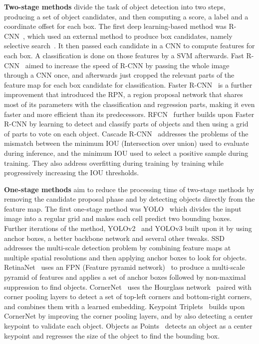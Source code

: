 \documentclass[10pt, conference, compsocconf]{IEEEtran}
\begin{document}
\textbf{Two-stage methods} divide the task of object detection into two steps, producing a set of object candidates, and then computing a score, a label and a coordinate offset for each box. The first deep learning-based method was R-CNN~\cite{rcnn_Girshick_2014_CVPR}, which used an external method to produce box candidates, namely selective search~\cite{uijlings2013selective}. It then passed each candidate in a CNN to compute features for each box. A classification is done on those features by a SVM afterwards. Fast R-CNN~\cite{Girshick_2015_ICCV_fast} aimed to increase the speed of R-CNN by passing the whole image through a CNN once, and afterwards just cropped the relevant parts of the feature map for each box candidate for classification. Faster R-CNN~\cite{ren2015faster} is a further improvement that introduced the RPN, a region proposal network that shares most of its parameters with the classification and regression parts, making it even faster and more efficient than its predecessors. RFCN~\cite{RFCN_NIPS2016_6465} further builds upon Faster R-CNN by learning to detect and classify parts of objects and then using a grid of parts to vote on each object. Cascade R-CNN~\cite{cai2018cascade} addresses the problems of the mismatch between the minimum IOU (Intersection over union) used to evaluate during inference, and the minimum IOU used to select a positive sample during training. They also address overfitting during training by training while progressively increasing the IOU thresholds. 

\textbf{One-stage methods} aim to reduce the processing time of two-stage methods by removing the candidate proposal phase and by detecting objects directly from the feature map. The first one-stage method was YOLO~\cite{redmon2016you_yolo} which divides the input image into a regular grid and makes each cell predict two bounding boxes. Further iterations of the method, YOLOv2~\cite{Redmon_2017_CVPR_YOLO2} and YOLOv3\cite{redmon2018yolov3} built upon it by using anchor boxes, a better backbone network and several other tweaks. SSD~\cite{liu2016ssd} addresses the multi-scale detection problem by combining feature maps at multiple spatial resolutions and then applying anchor boxes to look for objects. RetinaNet~\cite{lin2018focal} uses an FPN (Feature pyramid network)~\cite{Lin_2017_CVPR_FPN} to produce a multi-scale pyramid of features and applies a set of anchor boxes followed by non-maximal suppression to find objects. CornerNet~\cite{law2018cornernet} uses the Hourglass network~\cite{newell2016stacked} paired with corner pooling layers to detect a set of top-left corners and bottom-right corners, and combines them with a learned embedding. Keypoint Triplets~\cite{duan2019centernet} builds upon CornerNet by improving the corner pooling layers, and by also detecting a center keypoint to validate each object. Objects as Points~\cite{zhou2019objectsaspoints} detects an object as a center keypoint and regresses the size of the object to find the bounding box.
\end{document}
